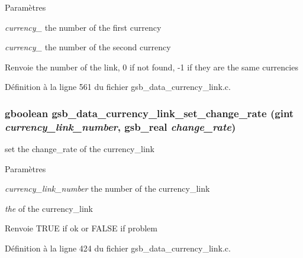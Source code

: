 \begin{DoxyParams}{Paramètres}
\item[{\em currency\_\-1}]the number of the first currency \item[{\em currency\_\-2}]the number of the second currency\end{DoxyParams}
\begin{DoxyReturn}{Renvoie}
the number of the link, 0 if not found, -\/1 if they are the same currencies 
\end{DoxyReturn}


Définition à la ligne 561 du fichier gsb\_\-data\_\-currency\_\-link.c.

\subsubsection[{gsb\_\-data\_\-currency\_\-link\_\-set\_\-change\_\-rate}]{\setlength{\rightskip}{0pt plus 5cm}gboolean gsb\_\-data\_\-currency\_\-link\_\-set\_\-change\_\-rate (gint {\em currency\_\-link\_\-number}, \/  {\bf gsb\_\-real} {\em change\_\-rate})}\label{gsb__data__currency__link_8h_a8d185945246d4c709ddafcf1daecfa38}
set the change\_\-rate of the currency\_\-link


\begin{DoxyParams}{Paramètres}
\item[{\em currency\_\-link\_\-number}]the number of the currency\_\-link \item[{\em the}]of the currency\_\-link\end{DoxyParams}
\begin{DoxyReturn}{Renvoie}
TRUE if ok or FALSE if problem 
\end{DoxyReturn}


Définition à la ligne 424 du fichier gsb\_\-data\_\-currency\_\-link.c.

